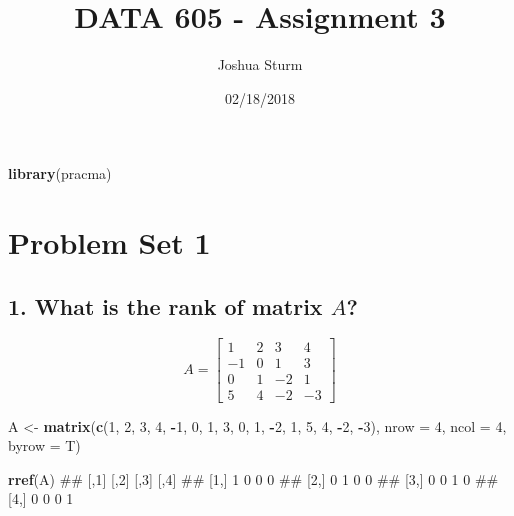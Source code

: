 \documentclass[]{article}
\title{DATA 605 - Assignment 3}
\author{Joshua Sturm}
\date{02/18/2018}
\newenvironment{Shaded}{\begin{snugshade}}{\end{snugshade}}
\newcommand{\KeywordTok}[1]{\textcolor[rgb]{0.13,0.29,0.53}{\textbf{#1}}}
\newcommand{\DataTypeTok}[1]{\textcolor[rgb]{0.13,0.29,0.53}{#1}}
\newcommand{\DecValTok}[1]{\textcolor[rgb]{0.00,0.00,0.81}{#1}}
\newcommand{\StringTok}[1]{\textcolor[rgb]{0.31,0.60,0.02}{#1}}
\newcommand{\OperatorTok}[1]{\textcolor[rgb]{0.81,0.36,0.00}{\textbf{#1}}}
\newcommand{\NormalTok}[1]{#1}
\begin{document}
\maketitle

\begin{Shaded}
\begin{Highlighting}[]
\KeywordTok{library}\NormalTok{(pracma)}
\end{Highlighting}
\end{Shaded}

\section{Problem Set 1}\label{problem-set-1}

\subsection{\texorpdfstring{1. What is the rank of matrix
\(A\)?}{1. What is the rank of matrix A?}}\label{what-is-the-rank-of-matrix-a}

\[A = \begin{bmatrix} 1 & 2 & 3 & 4\\
                     -1 & 0 & 1 & 3\\
                     0 & 1 & -2 & 1 \\
                     5 & 4 & -2 & -3
     \end{bmatrix}\]

\begin{Shaded}
\begin{Highlighting}[]
\NormalTok{A <-}\StringTok{ }\KeywordTok{matrix}\NormalTok{(}\KeywordTok{c}\NormalTok{(}\DecValTok{1}\NormalTok{, }\DecValTok{2}\NormalTok{, }\DecValTok{3}\NormalTok{, }\DecValTok{4}\NormalTok{,}
             \OperatorTok{-}\DecValTok{1}\NormalTok{, }\DecValTok{0}\NormalTok{, }\DecValTok{1}\NormalTok{, }\DecValTok{3}\NormalTok{,}
             \DecValTok{0}\NormalTok{, }\DecValTok{1}\NormalTok{, }\OperatorTok{-}\DecValTok{2}\NormalTok{, }\DecValTok{1}\NormalTok{,}
             \DecValTok{5}\NormalTok{, }\DecValTok{4}\NormalTok{, }\OperatorTok{-}\DecValTok{2}\NormalTok{, }\OperatorTok{-}\DecValTok{3}\NormalTok{),}
           \DataTypeTok{nrow =} \DecValTok{4}\NormalTok{, }\DataTypeTok{ncol =} \DecValTok{4}\NormalTok{, }\DataTypeTok{byrow =}\NormalTok{ T)}

\KeywordTok{rref}\NormalTok{(A)}
\NormalTok{##      [,1] [,2] [,3] [,4]}
\NormalTok{## [1,]    1    0    0    0}
\NormalTok{## [2,]    0    1    0    0}
\NormalTok{## [3,]    0    0    1    0}
\NormalTok{## [4,]    0    0    0    1}
\end{Highlighting}
\end{Shaded}
\end{document}
